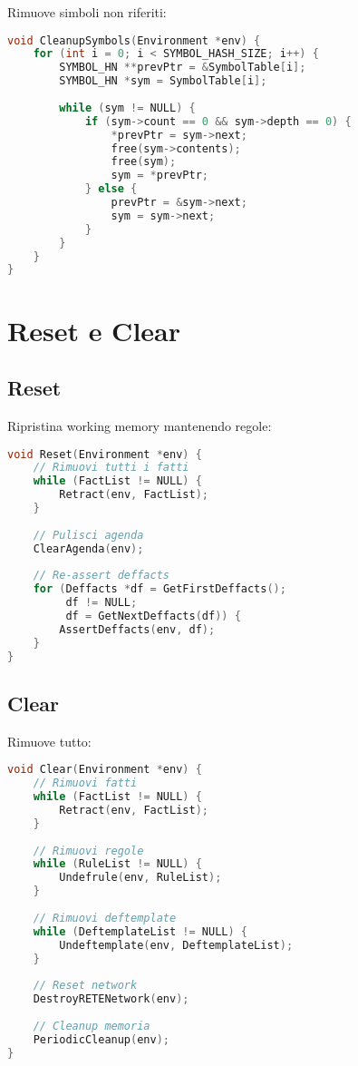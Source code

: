 Rimuove simboli non riferiti:

\begin{lstlisting}[language=C]
void CleanupSymbols(Environment *env) {
    for (int i = 0; i < SYMBOL_HASH_SIZE; i++) {
        SYMBOL_HN **prevPtr = &SymbolTable[i];
        SYMBOL_HN *sym = SymbolTable[i];
        
        while (sym != NULL) {
            if (sym->count == 0 && sym->depth == 0) {
                *prevPtr = sym->next;
                free(sym->contents);
                free(sym);
                sym = *prevPtr;
            } else {
                prevPtr = &sym->next;
                sym = sym->next;
            }
        }
    }
}
\end{lstlisting}

\section{Reset e Clear}

\subsection{Reset}

Ripristina working memory mantenendo regole:

\begin{lstlisting}[language=C]
void Reset(Environment *env) {
    // Rimuovi tutti i fatti
    while (FactList != NULL) {
        Retract(env, FactList);
    }
    
    // Pulisci agenda
    ClearAgenda(env);
    
    // Re-assert deffacts
    for (Deffacts *df = GetFirstDeffacts(); 
         df != NULL; 
         df = GetNextDeffacts(df)) {
        AssertDeffacts(env, df);
    }
}
\end{lstlisting}

\subsection{Clear}

Rimuove tutto:

\begin{lstlisting}[language=C]
void Clear(Environment *env) {
    // Rimuovi fatti
    while (FactList != NULL) {
        Retract(env, FactList);
    }
    
    // Rimuovi regole
    while (RuleList != NULL) {
        Undefrule(env, RuleList);
    }
    
    // Rimuovi deftemplate
    while (DeftemplateList != NULL) {
        Undeftemplate(env, DeftemplateList);
    }
    
    // Reset network
    DestroyRETENetwork(env);
    
    // Cleanup memoria
    PeriodicCleanup(env);
}
\end{lstlisting}

